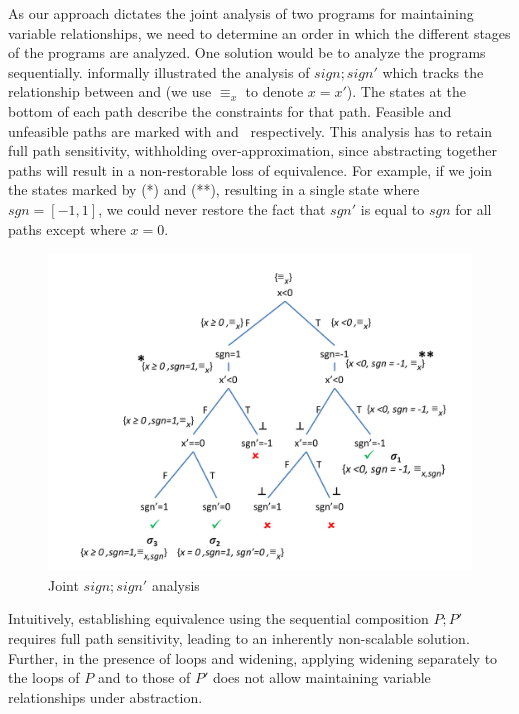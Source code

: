 As our approach dictates the joint analysis of two programs for maintaining variable relationships, we need to determine an order in which the different stages of the programs are analyzed. One solution would be to analyze the programs sequentially.  informally illustrated the analysis of $sign;sign'$ which tracks the relationship between  and  (we use $\equiv_{x}$ to denote $x=x'$). The states at the bottom of each path describe the constraints for that path. Feasible and unfeasible paths are marked with \checkmark and \xmark ~respectively. This analysis has to retain full path sensitivity, withholding over-approximation, since abstracting together paths will result in a non-restorable loss of equivalence. For example, if we join the states marked by (*) and (**), resulting in a single state where $sgn = [-1,1]$, we could never restore the fact that $sgn'$ is equal to $sgn$ for all paths except where $x=0$.
\begin{figure}
\centering
\includegraphics[scale=0.38,clip=true,trim = 45pt 15pt 0pt 35pt]{figures/sign-graph-joint}
\caption{Joint $sign;sign'$ analysis}
\end{figure}

Intuitively, establishing equivalence using the sequential composition $P;P'$ requires full path sensitivity, leading to an inherently non-scalable solution. Further, in the presence of loops and widening, applying widening separately to the loops of $P$ and to those of $P'$ does not allow maintaining variable relationships under abstraction.

